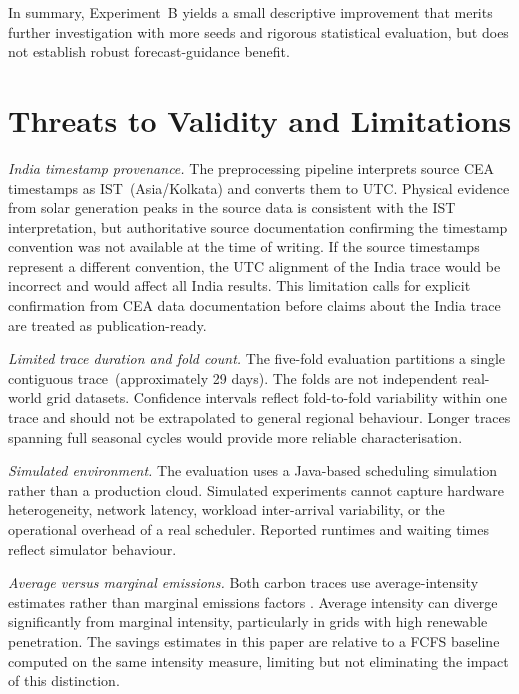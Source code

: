 \documentclass[conference]{IEEEtran}
\begin{document}
In summary, Experiment~B yields a small descriptive improvement that merits
further investigation with more seeds and rigorous statistical evaluation, but
does not establish robust forecast-guidance benefit.

\section{Threats to Validity and Limitations}
\label{sec:threats}

\textit{India timestamp provenance.} The preprocessing pipeline interprets
source CEA timestamps as IST~(Asia/Kolkata) and converts them to UTC. Physical
evidence from solar generation peaks in the source data is consistent with the
IST interpretation, but authoritative source documentation confirming the
timestamp convention was not available at the time of writing. If the source
timestamps represent a different convention, the UTC alignment of the India
trace would be incorrect and would affect all India results. This limitation
calls for explicit confirmation from CEA data documentation before claims about
the India trace are treated as publication-ready.

\textit{Limited trace duration and fold count.} The five-fold evaluation
partitions a single contiguous trace~(approximately 29 days). The folds are
not independent real-world grid datasets. Confidence intervals reflect
fold-to-fold variability within one trace and should not be extrapolated to
general regional behaviour. Longer traces spanning full seasonal cycles would
provide more reliable characterisation.

\textit{Simulated environment.} The evaluation uses a Java-based scheduling
simulation rather than a production cloud. Simulated experiments cannot capture
hardware heterogeneity, network latency, workload inter-arrival variability, or
the operational overhead of a real scheduler. Reported runtimes and waiting
times reflect simulator behaviour.

\textit{Average versus marginal emissions.} Both carbon traces use
average-intensity estimates rather than marginal emissions factors
\cite{siler2012should}. Average intensity can diverge significantly from
marginal intensity, particularly in grids with high renewable penetration. The
savings estimates in this paper are relative to a FCFS baseline computed on
the same intensity measure, limiting but not eliminating the impact of this
distinction.
\end{document}
